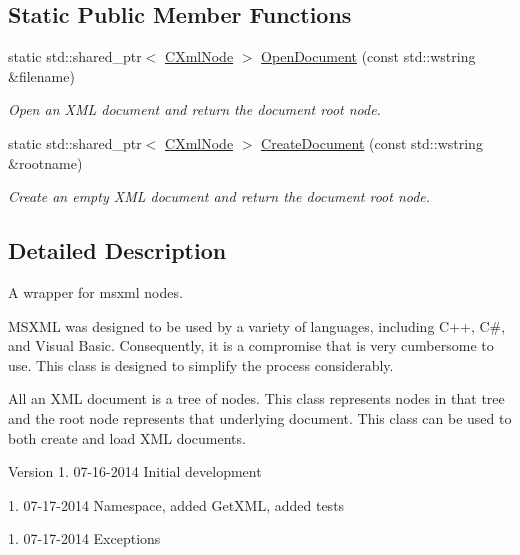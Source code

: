 \subsection*{Static Public Member Functions}
\begin{DoxyCompactItemize}
\item 
static std\+::shared\+\_\+ptr$<$ \hyperlink{classxmlnode_1_1_c_xml_node}{C\+Xml\+Node} $>$ \hyperlink{classxmlnode_1_1_c_xml_node_ad71ff87937ae943a9c11f5891d53d93b}{Open\+Document} (const std\+::wstring \&filename)
\begin{DoxyCompactList}\small\item\em Open an X\+M\+L document and return the document root node. \end{DoxyCompactList}\item 
static std\+::shared\+\_\+ptr$<$ \hyperlink{classxmlnode_1_1_c_xml_node}{C\+Xml\+Node} $>$ \hyperlink{classxmlnode_1_1_c_xml_node_ae50a4482c4ea73492001f91788945bb1}{Create\+Document} (const std\+::wstring \&rootname)
\begin{DoxyCompactList}\small\item\em Create an empty X\+M\+L document and return the document root node. \end{DoxyCompactList}\end{DoxyCompactItemize}


\subsection{Detailed Description}
A wrapper for msxml nodes. 

M\+S\+X\+M\+L was designed to be used by a variety of languages, including C++, C\#, and Visual Basic. Consequently, it is a compromise that is very cumbersome to use. This class is designed to simplify the process considerably.

All an X\+M\+L document is a tree of nodes. This class represents nodes in that tree and the root node represents that underlying document. This class can be used to both create and load X\+M\+L documents.

\begin{DoxyVersion}{Version}
1. 07-\/16-\/2014 Initial development 

1. 07-\/17-\/2014 Namespace, added Get\+X\+M\+L, added tests 

1. 07-\/17-\/2014 Exceptions 
\end{DoxyVersion}


